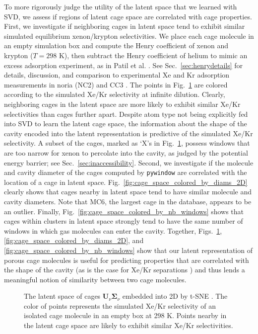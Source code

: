 \documentclass[journal=jacsat,manuscript=article,layout=traditional]{achemso}
\begin{document}
To more rigorously judge the utility of the latent space that we learned with SVD, we assess if regions of latent cage space are correlated with cage properties. First, we investigate if neighboring cages in latent space tend to exhibit similar simulated equilibrium xenon/krypton selectivities.
We place each cage molecule in an empty simulation box and compute the Henry coefficient of xenon and krypton ($T=298$ K), then subtract the Henry coefficient of helium to mimic an excess adsorption experiment, as in Patil et al. \cite{patil2016noria}. See Sec.~\ref{sec:henrydetails} for details, discussion, and comparison to experimental Xe and Kr adsorption measurements in noria (NC2) \cite{patil2016noria} and CC3 \cite{chen2014separation}.
The points in Fig.~\ref{fig:latent_space_S_Xe_Kr} are colored according to the simulated Xe/Kr selectivity at infinite dilution. Clearly, neighboring cages in the latent space are more likely to exhibit similar Xe/Kr selectivities than cages further apart. Despite atom type not being explicitly fed into SVD to learn the latent cage space, the information about the shape of the cavity encoded into the latent representation is predictive of the simulated Xe/Kr selectivity.
{\color{red} A subset of the cages, marked as `X's in Fig.~\ref{fig:latent_space_S_Xe_Kr}, possess windows that are too narrow for xenon to percolate into the cavity, as judged by the potential energy barrier; see Sec.~\ref{sec:inaccessibility}.
} 
Second, we investigate if the molecule and cavity diameter of the cages computed by \texttt{pywindow} \cite{miklitz2018pywindow} are correlated with the location of a cage in latent space. Fig.~\ref{fig:cage_space_colored_by_diams_2D} clearly shows that cages nearby in latent space tend to have similar molecule and cavity diameters. Note that MC6, the largest cage in the database, appears to be an outlier. 
Finally, Fig.~\ref{fig:cage_space_colored_by_nb_windows} shows that cages within clusters in latent space strongly tend to have the same number of windows in which gas molecules can enter the cavity.
Together, Figs.~\ref{fig:latent_space_S_Xe_Kr}, \ref{fig:cage_space_colored_by_diams_2D}, and \ref{fig:cage_space_colored_by_nb_windows} show that our latent representation of porous cage molecules is useful for predicting properties that are correlated with the shape of the cavity (as is the case for Xe/Kr separations \cite{sikora2012thermodynamic,simon2015best}) and thus lends a meaningful notion of similarity between two cage molecules.

\begin{figure}
\centering
	\caption{The latent space of cages $\mathbf{U}_\nu \mathbf{\Sigma}_\nu$ embedded into 2D by t-SNE \cite{maaten2008visualizing,wattenberg2016how}. The color of points represents the simulated Xe/Kr selectivity of an isolated cage molecule in an empty box at 298 K. Points nearby in the latent cage space are likely to exhibit similar Xe/Kr selectivities.
	} \label{fig:latent_space_S_Xe_Kr}
\end{figure}
\end{document}
